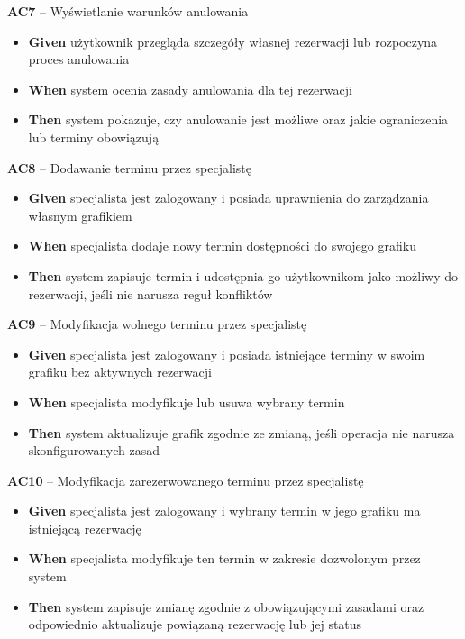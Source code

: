 \documentclass[12pt,a4paper]{article}
\begin{document}
\textbf{AC7} -- Wyświetlanie warunków anulowania
\begin{itemize}[itemsep=2pt]
\item \textbf{Given} użytkownik przegląda szczegóły własnej rezerwacji lub rozpoczyna proces anulowania
\item \textbf{When} system ocenia zasady anulowania dla tej rezerwacji
\item \textbf{Then} system pokazuje, czy anulowanie jest możliwe oraz jakie ograniczenia lub terminy obowiązują
\end{itemize}

\textbf{AC8} -- Dodawanie terminu przez specjalistę
\begin{itemize}[itemsep=2pt]
\item \textbf{Given} specjalista jest zalogowany i posiada uprawnienia do zarządzania własnym grafikiem
\item \textbf{When} specjalista dodaje nowy termin dostępności do swojego grafiku
\item \textbf{Then} system zapisuje termin i udostępnia go użytkownikom jako możliwy do rezerwacji, jeśli nie narusza reguł konfliktów
\end{itemize}

\textbf{AC9} -- Modyfikacja wolnego terminu przez specjalistę
\begin{itemize}[itemsep=2pt]
\item \textbf{Given} specjalista jest zalogowany i posiada istniejące terminy w swoim grafiku bez aktywnych rezerwacji
\item \textbf{When} specjalista modyfikuje lub usuwa wybrany termin
\item \textbf{Then} system aktualizuje grafik zgodnie ze zmianą, jeśli operacja nie narusza skonfigurowanych zasad
\end{itemize}

\textbf{AC10} -- Modyfikacja zarezerwowanego terminu przez specjalistę
\begin{itemize}[itemsep=2pt]
\item \textbf{Given} specjalista jest zalogowany i wybrany termin w jego grafiku ma istniejącą rezerwację
\item \textbf{When} specjalista modyfikuje ten termin w zakresie dozwolonym przez system
\item \textbf{Then} system zapisuje zmianę zgodnie z obowiązującymi zasadami oraz odpowiednio aktualizuje powiązaną rezerwację lub jej status
\end{itemize}
\end{document}

